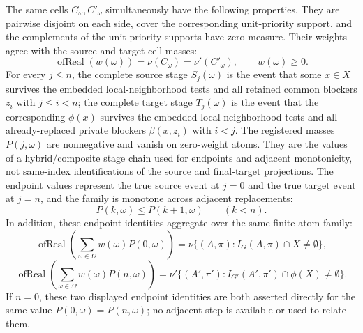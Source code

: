 \begin{helper}
The same cells \(C_\omega,C'_\omega\) simultaneously have the following
properties.  They are pairwise disjoint on each side, cover the corresponding
unit-priority support, and the complements of the unit-priority supports have
zero measure.  Their weights agree with the source and target cell masses:
\[
  \operatorname{ofReal}(w(\omega))=\nu(C_\omega)
  =\nu'(C'_\omega),
  \qquad w(\omega)\ge0 .
\]
For every \(j\le n\), the complete source stage \(S_j(\omega)\) is the event
that some \(x\in X\) survives the embedded local-neighborhood tests and all
retained common blockers \(z_i\) with \(j\le i<n\); the complete target stage
\(T_j(\omega)\) is the event that the corresponding \(\phi(x)\) survives the
embedded local-neighborhood tests and all already-replaced private blockers
\(\beta(x,z_i)\) with \(i<j\).  The registered masses \(P(j,\omega)\) are
nonnegative and vanish on zero-weight atoms.  They are the values of a
hybrid/composite stage chain used for endpoints and adjacent monotonicity,
not same-index identifications of the source and final-target projections.
The endpoint values represent the true source event at \(j=0\) and the true
target event at \(j=n\), and the family is monotone across adjacent
replacements:
\[
  P(k,\omega)\le P(k+1,\omega) \qquad(k<n).
\]
In addition, these endpoint identities aggregate over the same finite atom
family:
\[
  \operatorname{ofReal}\!\left(\sum_{\omega\in\Omega}w(\omega)P(0,\omega)\right)
  =
  \nu\{(A,\pi):I_G(A,\pi)\cap X\ne\emptyset\},
\]
\[
  \operatorname{ofReal}\!\left(\sum_{\omega\in\Omega}w(\omega)P(n,\omega)\right)
  =
  \nu'\{(A',\pi'):I_{G'}(A',\pi')\cap\phi(X)\ne\emptyset\}.
\]
If \(n=0\), these two displayed endpoint identities are both asserted
directly for the same value \(P(0,\omega)=P(n,\omega)\); no adjacent step is
available or used to relate them.
\end{helper}
